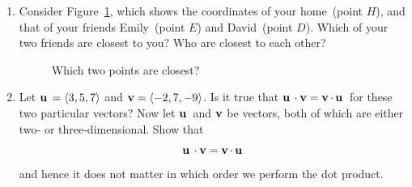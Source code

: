 \begin{enumerate}
\item Consider
  Figure~\ref{fig:vectors_matrices:which_two_points_closest}, which
  shows the coordinates of your home~(point $H$), and that of your
  friends Emily~(point $E$) and David~(point $D$). Which of your two
  friends are closest to you? Who are closest to each other?
%
\begin{figure}
\centering
{}
\caption{Which two points are closest?}
\label{fig:vectors_matrices:which_two_points_closest}
\end{figure}

\item Let $\operatorname*{\mathbf{u}}{} = \langle 3, 5, 7 \rangle$ and
  $\operatorname*{\mathbf{v}} = \langle -2, 7, -9 \rangle$. Is it true that
  $\operatorname*{\mathbf{u}}{} \cdot \operatorname*{\mathbf{v}} = \operatorname*{\mathbf{v}} \cdot \operatorname*{\mathbf{u}}{}$ for these two particular
  vectors? Now let $\operatorname*{\mathbf{u}}{}$ and $\operatorname*{\mathbf{v}}$ be vectors, both of which are
  either two- or three-dimensional. Show that
  \[
  \operatorname*{\mathbf{u}}{} \cdot \operatorname*{\mathbf{v}}
  =
  \operatorname*{\mathbf{v}} \cdot \operatorname*{\mathbf{u}}{}
  \]
  and hence it does not matter in which order we perform the dot
  product.


\end{enumerate}

